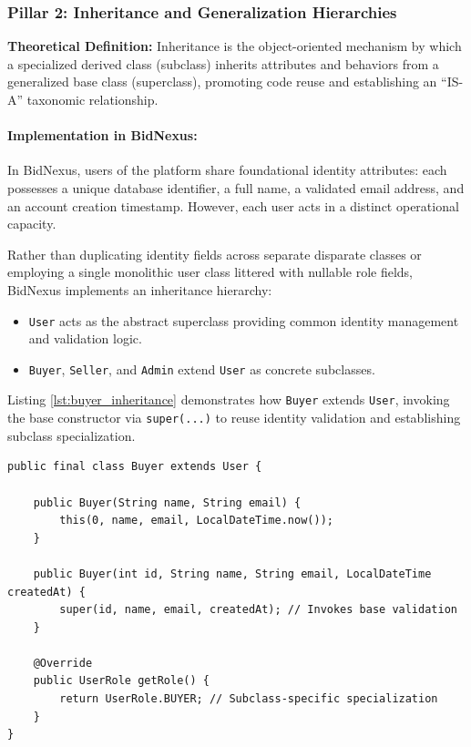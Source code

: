 \subsubsection{Pillar 2: Inheritance and Generalization Hierarchies}
\textbf{Theoretical Definition:} Inheritance is the object-oriented mechanism by which a specialized derived class (subclass) inherits attributes and behaviors from a generalized base class (superclass), promoting code reuse and establishing an ``IS-A'' taxonomic relationship.

\paragraph{Implementation in BidNexus:}
In BidNexus, users of the platform share foundational identity attributes: each possesses a unique database identifier, a full name, a validated email address, and an account creation timestamp. However, each user acts in a distinct operational capacity.

Rather than duplicating identity fields across separate disparate classes or employing a single monolithic user class littered with nullable role fields, BidNexus implements an inheritance hierarchy:
\begin{itemize}
    \item \texttt{User} acts as the abstract superclass providing common identity management and validation logic.
    \item \texttt{Buyer}, \texttt{Seller}, and \texttt{Admin} extend \texttt{User} as concrete subclasses.
\end{itemize}

Listing \ref{lst:buyer_inheritance} demonstrates how \texttt{Buyer} extends \texttt{User}, invoking the base constructor via \texttt{super(...)} to reuse identity validation and establishing subclass specialization.

\begin{lstlisting}[caption={Subclass Specialization via Inheritance in \texttt{Buyer.java}}, label={lst:buyer_inheritance}]
public final class Buyer extends User {

    public Buyer(String name, String email) {
        this(0, name, email, LocalDateTime.now());
    }

    public Buyer(int id, String name, String email, LocalDateTime createdAt) {
        super(id, name, email, createdAt); // Invokes base validation
    }

    @Override
    public UserRole getRole() {
        return UserRole.BUYER; // Subclass-specific specialization
    }
}
\end{lstlisting}

